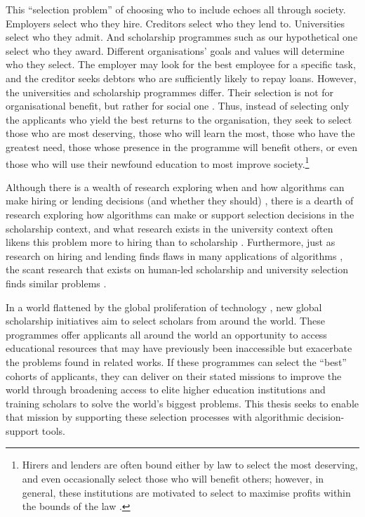 This ``selection problem'' of choosing who to include echoes all through society. Employers select who they hire. Creditors select who they lend to. Universities select who they admit. And scholarship programmes such as our hypothetical one select who they award. Different organisations' goals and values will determine who they select. The employer may look for the best employee for a specific task, and the creditor seeks debtors who are sufficiently likely to repay loans. However, the universities and scholarship programmes differ. Their selection is not for organisational benefit, but rather for social one \cite{Warikoo_2019}. Thus, instead of selecting only the applicants who yield the best returns to the organisation, they seek to select those who are most deserving, those who will learn the most, those who have the greatest need, those whose presence in the programme will benefit others, or even those who will use their newfound education to most improve society.\footnote{Hirers and lenders are often bound either by law to select the most deserving, and even occasionally select those who will benefit others; however, in general, these institutions are motivated to select to maximise profits within the bounds of the law \cite{schmidt1998validity}.}

Although there is a wealth of research exploring when and how algorithms can make hiring or lending decisions (and whether they should) \cite{schmidt1998validity,schumann2017diverse,raghavan2020mitigating,horodyski_applicants_2023,Leung_Zhang_Jibuti_Zhao_Klein_Pierce_Robert_Zhu_2020}, there is a dearth of research exploring how algorithms can make or support selection decisions in the scholarship context, and what research exists in the university context often likens this problem more to hiring than to scholarship \cite{schumann2017diverse,steel_multiple_2018,ijcai2023p819}. Furthermore, just as research on hiring and lending finds flaws in many applications of algorithms \cite{raghavan2020mitigating,horodyski_applicants_2023,Peng_Nushi_Kıcıman_Inkpen_Suri_Kamar_2019}, the scant research that exists on human-led scholarship and university selection finds similar problems \cite{schumann2017diverse}.

In a world flattened by the global proliferation of technology \cite{Friedman_2005}, new global scholarship initiatives aim to select scholars from around the world. These programmes offer applicants all around the world an opportunity to access educational resources that may have previously been inaccessible but exacerbate the problems found in related works. If these programmes can select the ``best'' cohorts of applicants, they can deliver on their stated missions to improve the world through broadening access to elite higher education institutions and training scholars to solve the world's biggest problems. This thesis seeks to enable that mission by supporting these selection processes with algorithmic decision-support tools.

